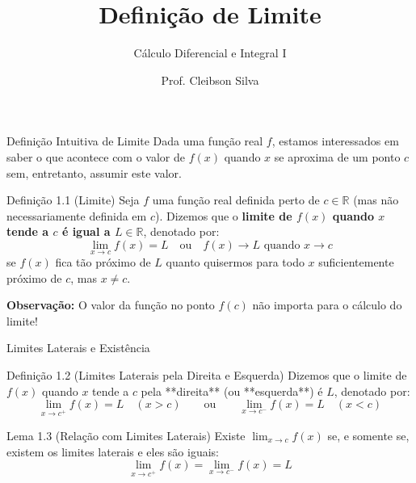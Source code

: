 \documentclass[10pt,aspectratio=169]{beamer}
\title[Cálculo I]{Definição de Limite}
\subtitle{Cálculo Diferencial e Integral I}
\author{Prof. Cleibson Silva}
\institute[IFPE]{Instituto Federal de Pernambuco -- Campus Caruaru}
\date{}
\begin{document}
\begin{frame}
    \transdissolve
    \titlepage
\end{frame}

\begin{frame}{Definição Intuitiva de Limite}
    \transblindshorizontal
    Dada uma função real $f$, estamos interessados em saber o que acontece com o valor de $f(x)$ quando $x$ se aproxima de um ponto $c$ sem, entretanto, assumir este valor.

    \vspace{0.2cm}\pause
    \begin{block}{Definição 1.1 (Limite)}
        Seja $f$ uma função real definida perto de $c \in \mathbb{R}$ (mas não necessariamente definida em $c$). Dizemos que o \textbf{limite de $f(x)$ quando $x$ tende a $c$ é igual a $L \in \mathbb{R}$}, denotado por:
        $$\lim_{x \to c} f(x) = L \quad \text{ou} \quad f(x) \to L \text{ quando } x \to c$$
        se $f(x)$ fica tão próximo de $L$ quanto quisermos para todo $x$ suficientemente próximo de $c$, mas $x \neq c$.
    \end{block}

    \vspace{0.3cm}\pause
    \alert{\textbf{Observação:}} O valor da função no ponto $f(c)$ não importa para o cálculo do limite!
\end{frame}

\begin{frame}{Limites Laterais e Existência}
    \transfade
    \begin{block}{Definição 1.2 (Limites Laterais pela Direita e Esquerda)}
        Dizemos que o limite de $f(x)$ quando $x$ tende a $c$ pela **direita** (ou **esquerda**) é $L$, denotado por:
        $$\lim_{x \to c^+} f(x) = L \quad (x > c) \qquad \text{ou} \qquad \lim_{x \to c^-} f(x) = L \quad (x < c)$$
    \end{block}

    \vspace{0.3cm}\pause
    \begin{alertblock}{Lema 1.3 (Relação com Limites Laterais)}
        Existe $\lim_{x \to c} f(x)$ se, e somente se, existem os limites laterais e eles são iguais:
        $$\lim_{x \to c^+} f(x) = \lim_{x \to c^-} f(x) = L$$
    \end{alertblock}
\end{frame}
\end{document}
